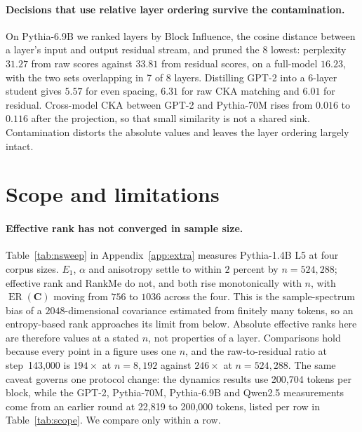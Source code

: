\documentclass{article}
\theoremstyle{spaced}
\theoremstyle{definition}
\DeclareMathOperator{\ER}{ER}
\newcommand{\bC}{\mathbf{C}}
\begin{document}
\paragraph{Decisions that use relative layer ordering survive the contamination.} On Pythia-6.9B we ranked layers by Block Influence, the cosine distance between a layer's input and output residual stream, and pruned the 8 lowest: perplexity $31.27$ from raw scores against $33.81$ from residual scores, on a full-model $16.23$, with the two sets overlapping in 7 of 8 layers. Distilling GPT-2 into a 6-layer student gives $5.57$ for even spacing, $6.31$ for raw CKA matching and $6.01$ for residual. Cross-model CKA between GPT-2 and Pythia-70M rises from $0.016$ to $0.116$ after the projection, so that small similarity is not a shared sink. Contamination distorts the absolute values and leaves the layer ordering largely intact.

\section{Scope and limitations}
\label{sec:limits}

\paragraph{Effective rank has not converged in sample size.} Table~\ref{tab:nsweep} in Appendix~\ref{app:extra} measures Pythia-1.4B L5 at four corpus sizes. $E_1$, $\alpha$ and anisotropy settle to within $2$ percent by $n = 524{,}288$; effective rank and RankMe do not, and both rise monotonically with $n$, with $\ER(\bC)$ moving from $756$ to $1036$ across the four. This is the sample-spectrum bias of a $2048$-dimensional covariance estimated from finitely many tokens, so an entropy-based rank approaches its limit from below. Absolute effective ranks here are therefore values at a stated $n$, not properties of a layer. Comparisons hold because every point in a figure uses one $n$, and the raw-to-residual ratio at step~143{,}000 is $194\times$ at $n = 8{,}192$ against $246\times$ at $n = 524{,}288$. The same caveat governs one protocol change: the dynamics results use 200{,}704 tokens per block, while the GPT-2, Pythia-70M, Pythia-6.9B and Qwen2.5 measurements come from an earlier round at 22{,}819 to 200{,}000 tokens, listed per row in Table~\ref{tab:scope}. We compare only within a row.
\end{document}
